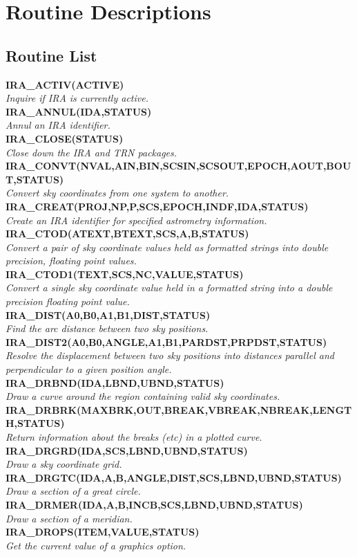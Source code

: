 \appendix
\section {Routine Descriptions}

\newcommand{\noteroutine}[2]{{\small \bf #1} \\
                              \hspace*{3em} {\em #2} \\[1.5ex]}

\subsection {Routine List}
\noteroutine{IRA\_ACTIV(ACTIVE)}
   {Inquire if IRA is currently active.}
\noteroutine{IRA\_ANNUL(IDA,STATUS)}
   {Annul an IRA identifier.}
\noteroutine{IRA\_CLOSE(STATUS)}
   {Close down the IRA and TRN packages.}
\noteroutine{IRA\_CONVT(NVAL,AIN,BIN,SCSIN,SCSOUT,EPOCH,AOUT,BOUT,STATUS)}
   {Convert sky coordinates from one system to another.}
\noteroutine{IRA\_CREAT(PROJ,NP,P,SCS,EPOCH,INDF,IDA,STATUS)}
   {Create an IRA identifier for specified astrometry information.}
\noteroutine{IRA\_CTOD(ATEXT,BTEXT,SCS,A,B,STATUS)}
   {Convert a pair of sky coordinate values held as formatted strings into
   double precision, floating point values.}
\noteroutine{IRA\_CTOD1(TEXT,SCS,NC,VALUE,STATUS)}
   {Convert a single sky coordinate value held in a formatted string into a
   double precision floating point value.}
\noteroutine{IRA\_DIST(A0,B0,A1,B1,DIST,STATUS)}
   {Find the arc distance between two sky positions.}
\noteroutine{IRA\_DIST2(A0,B0,ANGLE,A1,B1,PARDST,PRPDST,STATUS)}
   {Resolve the displacement between two sky positions into distances parallel
    and perpendicular to a given position angle.}
\noteroutine{IRA\_DRBND(IDA,LBND,UBND,STATUS)}
   {Draw a curve around the region containing valid sky coordinates.}
\noteroutine{IRA\_DRBRK(MAXBRK,OUT,BREAK,VBREAK,NBREAK,LENGTH,STATUS)}
   {Return information about the breaks (etc) in a plotted curve.}
\noteroutine{IRA\_DRGRD(IDA,SCS,LBND,UBND,STATUS)}
   {Draw a sky coordinate grid.}
\noteroutine{IRA\_DRGTC(IDA,A,B,ANGLE,DIST,SCS,LBND,UBND,STATUS)}
   {Draw a section of a great circle.}
\noteroutine{IRA\_DRMER(IDA,A,B,INCB,SCS,LBND,UBND,STATUS)}
   {Draw a section of a meridian.}
\noteroutine{IRA\_DROPS(ITEM,VALUE,STATUS)}
   {Get the current value of a graphics option.}
